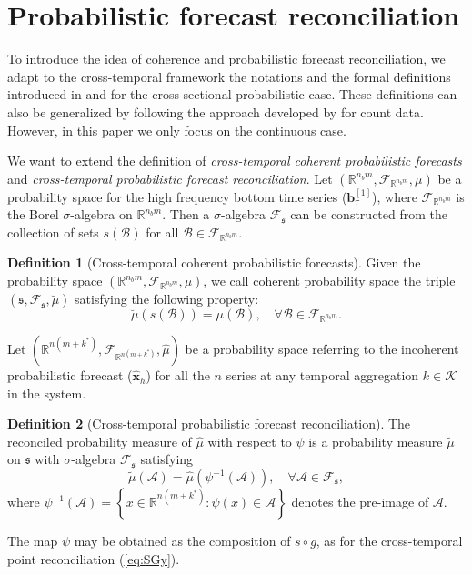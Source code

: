 \documentclass[a4paper,11pt]{article}
\newcommand{\bvet}{\bm{b}}
\newcommand{\xvet}{\bm{x}}
\theoremstyle{definition}
\newtheorem{definition}{Definition}[section]
\begin{document}
\section{Probabilistic forecast reconciliation}\label{sec:prob}

To introduce the idea of coherence and probabilistic forecast reconciliation, we adapt to the cross-temporal framework the notations and the formal definitions introduced in \cite{wickramasuriya2021b} and \cite{panagiotelis2023} for the cross-sectional probabilistic case. These definitions can also be generalized by following the approach developed by \cite{corani2022} for count data. However, in this paper we only focus on the continuous case.

We want to extend the definition of \textit{cross-temporal coherent probabilistic forecasts} and \textit{cross-temporal probabilistic forecast reconciliation}.
Let $\left(\mathbb{R}^{n_b m}, \mathcal{F}_{\mathbb{R}^{n_b m}}, \mu\right)$ be a probability space for the high frequency bottom time series ($\bvet_{\tau}^{[1]}$), where $\mathcal{F}_{\mathbb{R}^{n_b m}}$ is the Borel $\sigma$-algebra on $\mathbb{R}^{n_b m}$. Then a $\sigma$-algebra $\mathcal{F}_{\mathfrak{s}}$ can be constructed from the collection of sets $s(\mathcal{B})$ for all $\mathcal{B} \in \mathcal{F}_{\mathbb{R}^{n_b m}}$.
\begin{definition}[Cross-temporal coherent probabilistic forecasts]
	Given the probability space $\left(\mathbb{R}^{n_b m}, \mathcal{F}_{\mathbb{R}^{n_b m}}, \mu\right)$, we call coherent probability space the triple $\left(\mathfrak{s}, \mathcal{F}_{\mathfrak{s}}, \breve{\mu}\right)$ satisfying the following property:
$$
\breve{\mu}(s(\mathcal{B}))=\mu(\mathcal{B}), \quad \forall \mathcal{B} \in \mathcal{F}_{\mathbb{R}^{n_b m}} .
$$
\end{definition}
Let $\left(\mathbb{R}^{n(m+k^\ast)}, \mathcal{F}_{\mathbb{R}^{n(m+k^\ast)}}, \hat{\mu}\right)$ be a probability space referring to the incoherent probabilistic forecast ($\widehat{\xvet}_{h}$) for all the $n$ series at any temporal aggregation $k \in \mathcal{K}$ in the system.
\begin{definition}[Cross-temporal probabilistic forecast reconciliation]\label{def:pfr}
The reconciled probability measure of $\hat{\mu}$ with respect to $\psi$ is a probability measure $\tilde{\mu}$ on $\mathfrak{s}$ with $\sigma$-algebra $\mathcal{F}_{\mathfrak{s}}$ satisfying
\begin{equation}\label{eq:pfr}
	\tilde{\mu}(\mathcal{A})=\hat{\mu}\left(\psi^{-1}(\mathcal{A})\right), \quad \forall \mathcal{A} \in \mathcal{F}_{\mathfrak{s}},
\end{equation}
where $\psi^{-1}(\mathcal{A})=\left\{x \in \mathbb{R}^{n(m+k^\ast)}: \psi(x) \in \mathcal{A}\right\}$ denotes the pre-image of $\mathcal{A}$.
\end{definition}
The map $\psi$ may be obtained as the composition of $s \circ g$, as for the cross-temporal point reconciliation (\ref{eq:SGy}).
\end{document}
